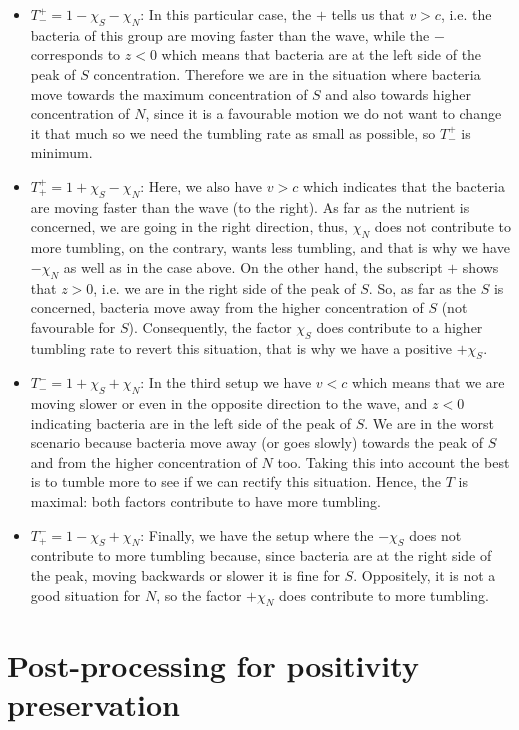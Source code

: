 \documentclass[11pt,twoside]{article}
\numberwithin{equation}{section}
\theoremstyle{plain}
\theoremstyle{nonumberplain}
\begin{document}
\begin{itemize}
    \item $T^+_- = 1-\chi_S-\chi_N$: In this particular case, the $+$ tells us that $v>c$, i.e. the bacteria of this group are moving faster than the wave, while the $-$ corresponds to $z<0$ which means that bacteria are at the left side of the peak of $S$ concentration. Therefore we are in the situation where bacteria move towards the maximum concentration of $S$ and also towards higher concentration of $N$, since it is a favourable motion we do not want to change it that much so we need the tumbling rate as small as possible, so $T^+_-$ is minimum.
    \item $T^+_+ = 1+\chi_S-\chi_N$: Here, we also have $v>c$ which indicates that the bacteria are moving faster than the wave (to the right). As far as the nutrient is concerned, we are going in the right direction, thus, $\chi_N$ does not contribute to more tumbling, on the contrary, wants less tumbling, and that is why we have $-\chi_N$ as well as in the case above. On the other hand, the subscript $+$ shows that $z>0$, i.e. we are in the right side of the peak of $S$. So, as far as the $S$ is concerned, bacteria move away from the higher concentration of $S$ (not favourable for $S$). Consequently, the factor $\chi_S$ does contribute to a higher tumbling rate to revert this situation, that is why we have a positive $+\chi_S$.

    \item $T^-_- = 1+\chi_S+\chi_N$: In the third setup we have $v<c$ which means that we are moving slower or even in the opposite direction to the wave, and $z<0$ indicating bacteria are in the left side of the peak of $S$. We are in the worst scenario because bacteria move away (or goes slowly) towards the peak of $S$ and from the higher concentration of $N$ too. Taking this into account the best is to tumble more to see if we can rectify this situation. Hence, the $T$ is maximal: both factors contribute to have more tumbling.

    \item $T^-_+ = 1-\chi_S+\chi_N$: Finally, we have the setup where the $-\chi_S$ does not contribute to more tumbling because, since bacteria are at the right side of the peak, moving backwards or slower it is fine for $S$. Oppositely, it is not a good situation for $N$, so the factor $+\chi_N$ does contribute to more tumbling.
\end{itemize}

\section{Post-processing for positivity preservation}
\label{sec:limiter}
\end{document}
